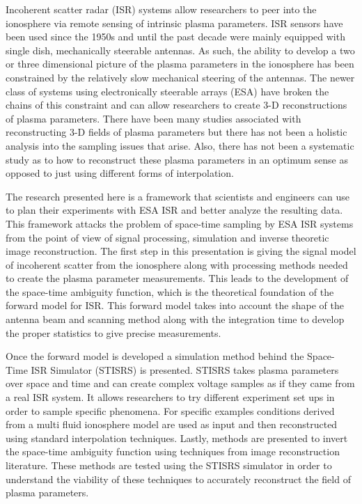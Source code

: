
Incoherent scatter radar (ISR) systems allow researchers to peer into the ionosphere via remote sensing of intrinsic plasma parameters. ISR sensors have been used since the 1950s and until the past decade were mainly equipped with single dish, mechanically steerable antennas. As such, the ability to develop a two or three dimensional picture of the plasma parameters in the ionosphere has been constrained by the relatively slow mechanical steering of the antennas. The newer class of systems using electronically steerable arrays (ESA) have broken the chains of this constraint and can allow researchers to create 3-D reconstructions of plasma parameters. There have been many studies associated with reconstructing 3-D fields of plasma parameters but there has not been a holistic analysis into the sampling issues that arise. Also, there has not been a systematic study as to how to reconstruct these plasma parameters in an optimum sense as opposed to just using different forms of interpolation.

The research presented here is a framework that scientists and engineers can use to plan their experiments with ESA ISR and better analyze the resulting data. This framework attacks the problem of space-time sampling by ESA ISR systems from the point of view of signal processing, simulation and inverse theoretic image reconstruction. The first step in this presentation is giving the signal model of incoherent scatter from the ionosphere along with processing methods needed to create the plasma parameter measurements. This leads to the development of the space-time ambiguity function, which is the theoretical foundation of the forward model for ISR. This forward model takes into account the shape of the antenna beam and scanning method along with the integration time to develop the proper statistics to give precise measurements.

Once the forward model is developed a simulation method behind the Space-Time ISR Simulator (STISRS) is presented. STISRS takes plasma parameters over space and time and can create complex voltage samples as if they came from a real ISR system. It allows researchers to try different experiment set ups in order to sample specific phenomena. For specific examples conditions derived from a multi fluid ionosphere model are used as input and then reconstructed using standard interpolation techniques. Lastly, methods are presented to invert the space-time ambiguity function using techniques from image reconstruction literature. These methods are tested using the STISRS simulator in order to understand the viability of these techniques to accurately reconstruct the field of plasma parameters.

